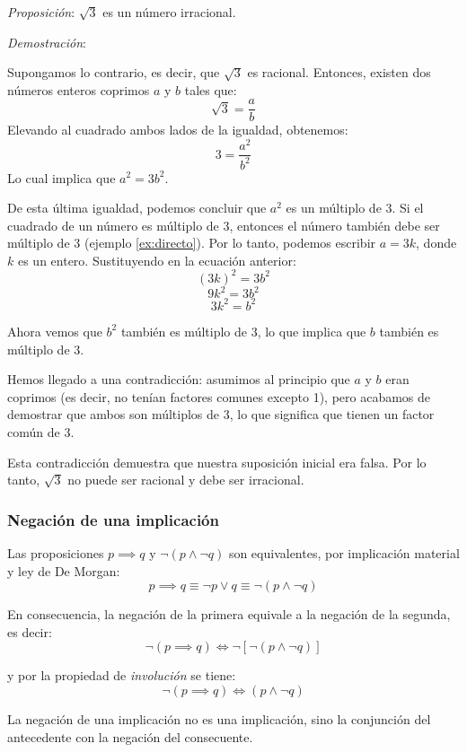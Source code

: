 \begin{fmd-example}
\textit{Proposición}: $\sqrt{3}$ es un número irracional.

\textit{Demostración}:

Supongamos lo contrario, es decir, que $\sqrt{3}$ es racional. Entonces, existen dos números enteros coprimos $a$ y $b$ tales que:
$$\sqrt{3} = \frac{a}{b}$$
Elevando al cuadrado ambos lados de la igualdad, obtenemos:
$$3 = \frac{a^2}{b^2}$$
Lo cual implica que $a^2 = 3b^2$.

De esta última igualdad, podemos concluir que $a^2$ es un múltiplo de 3. Si el cuadrado de un número es múltiplo de 3, entonces el número también debe ser múltiplo de 3 (ejemplo \ref{ex:directo}). Por lo tanto, podemos escribir $a = 3k$, donde $k$ es un entero. Sustituyendo en la ecuación anterior:
$$(3k)^2 = 3b^2$$
$$9k^2 = 3b^2$$
$$3k^2 = b^2$$

Ahora vemos que $b^2$ también es múltiplo de 3, lo que implica que $b$ también es múltiplo de 3.

Hemos llegado a una contradicción: asumimos al principio que $a$ y $b$ eran coprimos (es decir, no tenían factores comunes excepto 1), pero acabamos de demostrar que ambos son múltiplos de 3, lo que significa que tienen un factor común de 3. 

Esta contradicción demuestra que nuestra suposición inicial era falsa. Por lo tanto, $\sqrt{3}$ no puede ser racional y debe ser irracional.
\end{fmd-example}

\subsubsection{Negación de una implicación} 
Las proposiciones $p \implies q$ y $\neg (p \land \neg q)$ son equivalentes, por implicación material y ley de De Morgan:
\[ p \implies q \equiv \neg p \lor q \equiv \neg \left( p \land \neg q \right) \]

En consecuencia, la negación de la primera equivale a la negación de la segunda, es decir:
\[ \neg (p \implies q) \iff \neg [ \neg (p \land \neg q)] \]

y por la propiedad de \textit{involución} se tiene:
\[ \neg (p \implies q) \iff (p \land \neg q) \]

La negación de una implicación no es una implicación, sino la conjunción del antecedente con la negación del consecuente.

